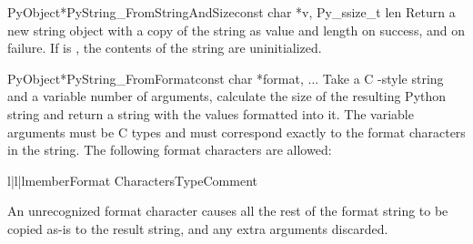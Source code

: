 \begin{cfuncdesc}{PyObject*}{PyString_FromStringAndSize}{const char *v,
                                                         Py_ssize_t len}
  Return a new string object with a copy of the string  as value
  and length  on success, and \NULL{} on failure.  If  is
  \NULL{}, the contents of the string are uninitialized.
\end{cfuncdesc}

\begin{cfuncdesc}{PyObject*}{PyString_FromFormat}{const char *format, ...}
  Take a C -style  string and a
  variable number of arguments, calculate the size of the resulting
  Python string and return a string with the values formatted into
  it.  The variable arguments must be C types and must correspond
  exactly to the format characters in the  string.  The
  following format characters are allowed:




  \begin{tableiii}{l|l|l}{member}{Format Characters}{Type}{Comment}
  \end{tableiii}

  An unrecognized format character causes all the rest of the format
  string to be copied as-is to the result string, and any extra
  arguments discarded.
\end{cfuncdesc}

